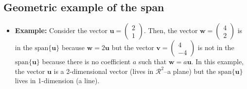 \documentclass[
]{book}
\providecommand{\tightlist}{%
  \setlength{\itemsep}{0pt}\setlength{\parskip}{0pt}}
\theoremstyle{definition}
\theoremstyle{definition}
\theoremstyle{definition}
\theoremstyle{remark}
\begin{document}
\hypertarget{geometric-example-of-the-span}{%
\subsection{Geometric example of the span}\label{geometric-example-of-the-span}}

\begin{itemize}
\tightlist
\item
  \textbf{Example:} Consider the vector \(\mathbf{u} = \begin{pmatrix} 2 \\ 1 \end{pmatrix}\). Then, the vector \(\mathbf{w} = \begin{pmatrix} 4 \\ 2 \end{pmatrix}\) is in the \(\mbox{span}\{\mathbf{u}\}\) because \(\mathbf{w} = 2 \mathbf{u}\) but the vector \(\mathbf{v} = \begin{pmatrix} 4 \\ -4 \end{pmatrix}\) is not in the \(\mbox{span}\{\mathbf{u}\}\) because there is no coefficient \(a\) such that \(\mathbf{w} = a \mathbf{u}\). In this example, the vector \(\mathbf{u}\) is a 2-dimensional vector (lives in \(\mathcal{R}^2\)--a plane) but the \(\mbox{span}\{\mathbf{u}\}\) lives in 1-dimension (a line).
\end{itemize}
\end{document}
